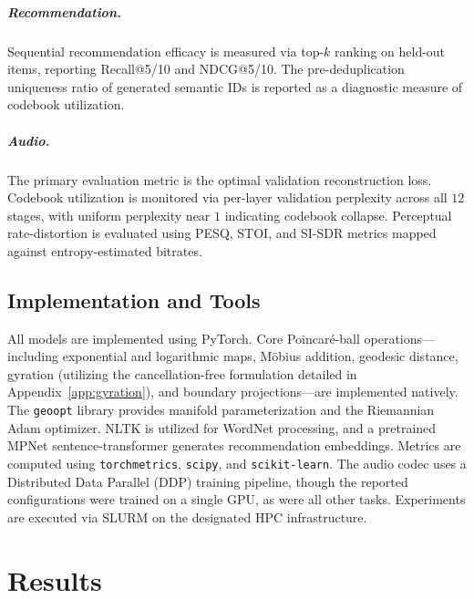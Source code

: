 \documentclass[12pt]{report}
\begin{document}
\paragraph{Recommendation.} Sequential recommendation efficacy is measured via top-$k$ ranking on held-out items, reporting Recall@5/10 and NDCG@5/10. The pre-deduplication uniqueness ratio of generated semantic IDs is reported as a diagnostic measure of codebook utilization.

\paragraph{Audio.} The primary evaluation metric is the optimal validation reconstruction loss. Codebook utilization is monitored via per-layer validation perplexity across all $12$ stages, with uniform perplexity near $1$ indicating codebook collapse. Perceptual rate-distortion is evaluated using PESQ, STOI, and SI-SDR metrics mapped against entropy-estimated bitrates.

\section{Implementation and Tools}
\label{sec:tools}

All models are implemented using PyTorch. Core Poincar\'e-ball operations---including exponential and logarithmic maps, M\"obius addition, geodesic distance, gyration (utilizing the cancellation-free formulation detailed in Appendix~\ref{app:gyration}), and boundary projections---are implemented natively. The \texttt{geoopt} library provides manifold parameterization and the Riemannian Adam optimizer. NLTK is utilized for WordNet processing, and a pretrained MPNet sentence-transformer generates recommendation embeddings. Metrics are computed using \texttt{torchmetrics}, \texttt{scipy}, and \texttt{scikit-learn}. The audio codec uses a Distributed Data Parallel (DDP) training pipeline, though the reported configurations were trained on a single GPU, as were all other tasks. Experiments are executed via SLURM on the designated HPC infrastructure.

\chapter{Results}
\label{chap:experiments}
\end{document}
